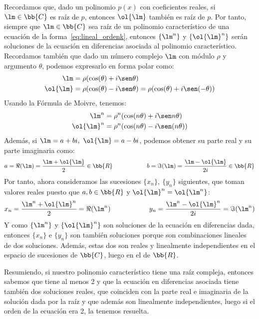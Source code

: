 Recordamos que, dado un polinomio $p(x)$ con coeficientes reales, si $\lm \in \bb{C}$ es raíz de $p$, entonces $\ol{\lm}$ también es raíz de $p$.  Por tanto, siempre que $\lm\in \bb{C}$ sea raíz de un polinomio característico de una ecuación de la forma~\ref{eq:lineal_ordenk}, entonces $\{\lm^n\}$ y $\left\{\ol{\lm}^n\right\}$ serán soluciones de la ecuación en diferencias asociada al polinomio característico. Recordamos también que dado un número complejo $\lm$ con módulo $\rho$ y argumento $\theta$, podemos expresarlo en forma polar como:
\begin{align*}
    \lm &= \rho (\cos(\theta) + i\sen \theta)\\
    \ol{\lm} &= \rho (\cos(\theta) - i\sen \theta) = \rho(\cos(\theta) + i\sen(-\theta))
\end{align*}
Usando la Fórmula de Moivre, tenemos:
\begin{align*}
    \lm^n &= \rho^n (\cos(n\theta) + i\sen n\theta) \\
    \ol{\lm}^n &= \rho^n (\cos(n\theta) - i\sen(n\theta)) 
\end{align*}
Además, si $\lm = a+bi,~\ol{\lm} = a-bi$, podemos obtener su parte real y su parte imaginaria como:
\begin{align*}
    a = \Re(\lm) = \dfrac{\lm+\ol{\lm}}{2} \in \bb{R}\hspace{2cm}
    b = \Im(\lm) = \dfrac{\lm-\ol{\lm}}{2i}\in \bb{R}
\end{align*}
Por tanto, ahora consideramos las sucesiones $\{x_n\},~\{y_n\}$ siguientes, que toman valores reales puesto que $a,b\in \bb{R}$ y $\ol{\lm}^n = \ol{\lm^n}$:
\begin{align*}
    x_n = \dfrac{\lm^n+\ol{\lm}^n}{2} = \Re(\lm^n) \hspace{2cm}
    y_n = \dfrac{\lm^n-\ol{\lm}^n}{2i} = \Im(\lm^n)
\end{align*} 
Y como $\{\lm^n\}$ y $\left\{\ol{\lm}^n\right\}$ son soluciones de la ecuación en diferencias dada, entonces $\{x_n\}$ e $\{y_n\}$ son también soluciones porque son combinaciones lineales de dos soluciones. Además, estas dos son reales y linealmente independientes en el espacio de sucesiones de $\bb{C}$, luego en el de $\bb{R}$.

Resumiendo, si nuestro polinomio característico tiene una raíz compleja, entonces sabemos que tiene al menos 2 y que la ecuación en diferencias asociada tiene también dos soluciones reales, que coinciden con la parte real e imaginaria de la solución dada por la raíz y que además son linealmente independientes, luego si el orden de la ecuación era 2, la tenemos resuelta.\\

